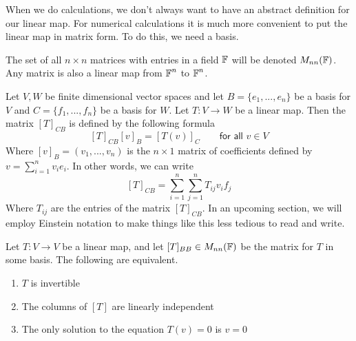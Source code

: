 When we do calculations, we don't always want to have an abstract definition for our linear map. For numerical calculations it is much more convenient to put the linear map in matrix form. To do this, we need a basis.

\begin{defn}The set of all $n\times n$ matrices with entries in a field $\operatorname{\mathbb{F}}$ will be denoted $M_{nn}(\operatorname{\mathbb{F}})$. Any matrix is also a linear map from $\operatorname{\mathbb{F}}^n$ to $\operatorname{\mathbb{F}}^n$.    
\end{defn}
\begin{defn} Let $V,W$ be finite dimensional vector spaces and let $B = \{e_1,...,e_n\}$ be a basis for $V$ and $C=\{f_1,...,f_n\}$ be a basis for $W$. Let $T : V \to W$ be a linear map. Then the matrix $[T]_{CB}$ is defined by the following formula
\[[T]_{CB}[v]_B = [T(v)]_C \qquad \textsf{for all }v\in V\]
Where $[v]_B = (v_1,...,v_n)$ is the $n\times 1$ matrix of coefficients defined by $v = \sum_{i=1}^n v_i e_i$. In other words, we can write
\[[T]_{CB} = \sum_{i=1}^n\sum_{j=1}^n T_{ij} v_i f_j\]
Where $T_{ij}$ are the entries of the matrix $[T]_{CB}$.
In an upcoming section, we will employ Einstein notation to make things like this less tedious to read and write.
\end{defn}

\begin{thm}
    Let $T : V \to V$ be a linear map, and let $[T]_{BB} \in M_{nn}(\operatorname{\mathbb{F}})$ be the matrix for $T$ in some basis. The following are equivalent.
    \begin{enumerate}
    \item {$T$ is invertible}
    \item {The columns of $[T]$ are linearly independent}
    \item {The only solution to the equation $T(v) = 0$ is $v=0$ }
    \end{enumerate}
\end{thm}

